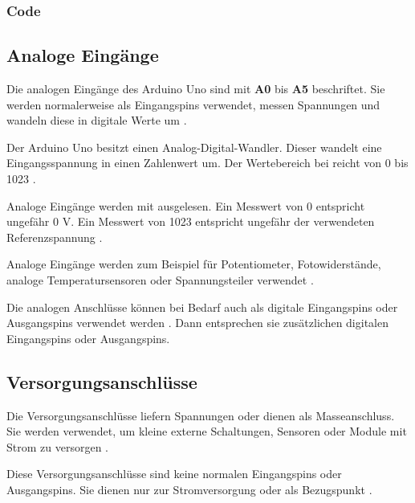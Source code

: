\subsubsection{Code}

{
	\label{lst:LEDDimmenPWM}
}





\subsection{Analoge Eingänge}



Die analogen Eingänge des Arduino Uno sind mit \textbf{A0} bis \textbf{A5} beschriftet. Sie werden normalerweise als Eingangspins verwendet, messen Spannungen und wandeln diese in digitale Werte um \cite{arduino:uno-r3}\cite{arduino:analogread}.

Der Arduino Uno besitzt einen Analog-Digital-Wandler. Dieser wandelt eine Eingangsspannung in einen Zahlenwert um. Der Wertebereich bei  reicht von 0 bis 1023 \cite{arduino:analogread}.



Analoge Eingänge werden mit  ausgelesen. Ein Messwert von 0 entspricht ungefähr 0 V. Ein Messwert von 1023 entspricht ungefähr der verwendeten Referenzspannung \cite{arduino:analogread}.

Analoge Eingänge werden zum Beispiel für Potentiometer, Fotowiderstände, analoge Temperatursensoren oder Spannungsteiler verwendet \cite{arduino:analogread}.

Die analogen Anschlüsse können bei Bedarf auch als digitale Eingangspins oder Ausgangspins verwendet werden \cite{arduino:uno-datasheet}. Dann entsprechen sie zusätzlichen digitalen Eingangspins oder Ausgangspins.


\subsection{Versorgungsanschlüsse}



Die Versorgungsanschlüsse liefern Spannungen oder dienen als Masseanschluss. Sie werden verwendet, um kleine externe Schaltungen, Sensoren oder Module mit Strom zu versorgen \cite{arduino:uno-datasheet}.

Diese Versorgungsanschlüsse sind keine normalen Eingangspins oder Ausgangspins. Sie dienen nur zur Stromversorgung oder als Bezugspunkt \cite{arduino:uno-components}.


